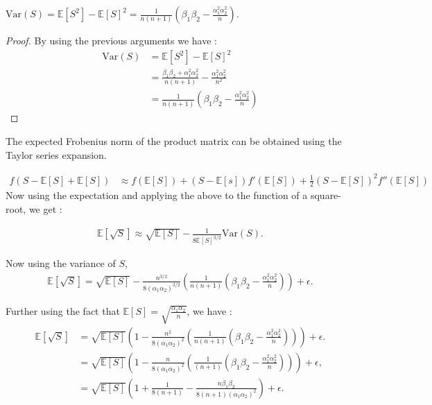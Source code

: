 \documentclass[onefignum,onetabnum]{siamart171218}
\begin{document}
\begin{lemma}
$\text{Var}(S) = \mathbb{E}[S^2] - \mathbb{E}[S]^2 = \frac{1}{n(n+1)} \left( \beta_1 \beta_2 - \frac{\alpha_1^2 \alpha_2^2}{n} \right)$.    
\end{lemma}
\begin{proof}
    By using the previous arguments we have :
    \begin{align*}
        \text{Var}(S) &= \mathbb{E}[S^2] - \mathbb{E}[S]^2 \\
        &= \frac{\beta_1\beta_2 + \alpha_1^2 \alpha_2^2}{n(n+1)} - \frac{\alpha_1^2 \alpha_2^2}{n^2} \\
        &= \frac{1}{n(n+1)} \left( \beta_1 \beta_2 - \frac{\alpha_1^2 \alpha_2^2}{n} \right)
    \end{align*}
\end{proof}

The expected Frobenius norm of the product matrix can be obtained using the Taylor series expansion. 

\begin{align*}
    f(S - \mathbb{E}[S] + \mathbb{E}[S]) &\approx f(\mathbb{E}[S]) + (S - \mathbb{E}[s])f'(\mathbb{E}[S]) +\frac{1}{2} (S - \mathbb{E}[S])^2 f''(\mathbb{E}[S])  
\end{align*}
Now using the expectation and applying the above to the function of a square-root, we get :

\begin{align*}
    \mathbb{E}[\sqrt{S}] \approx \sqrt{\mathbb{E}[S]} - \frac{1}{8 \mathbb{E}[S]^{3/2}}\text{Var}(S).
\end{align*}

Now using the variance of $S$,
\begin{align*}
    \mathbb{E}[\sqrt{S}] =  \sqrt{\mathbb{E}[S]} - \frac{n^{3/2}}{8 (\alpha_1 \alpha_2)^{3/2}}\left(  \frac{1}{n(n+1)} \left( \beta_1 \beta_2 - \frac{\alpha_1^2 \alpha_2^2}{n} \right) \right) + \epsilon.
\end{align*}

Further using the fact that $\mathbb{E}[S] = \sqrt{\frac{\alpha_1 \alpha_2}{n}}$, we have :
\begin{align*}
    \mathbb{E}[\sqrt{S}] &=  \sqrt{\mathbb{E}[S]}\left(1 - \frac{n^{2}}{8 (\alpha_1 \alpha_2)^{2}}\left(  \frac{1}{n(n+1)} \left( \beta_1 \beta_2 - \frac{\alpha_1^2 \alpha_2^2}{n} \right) \right) \right) + \epsilon. \\
    &= \sqrt{\mathbb{E}[S]}\left(1 - \frac{n}{8 (\alpha_1 \alpha_2)^{2}}\left(  \frac{1}{(n+1)} \left( \beta_1 \beta_2 - \frac{\alpha_1^2 \alpha_2^2}{n} \right) \right) \right) + \epsilon, \\
     &= \sqrt{\mathbb{E}[S]}\left(1 + \frac{1}{8(n+1)} - \frac{n\beta_1 \beta_2  }{8(n+1) (\alpha_1 \alpha_2)^{2}} \right) + \epsilon. 
\end{align*}
\end{document}

